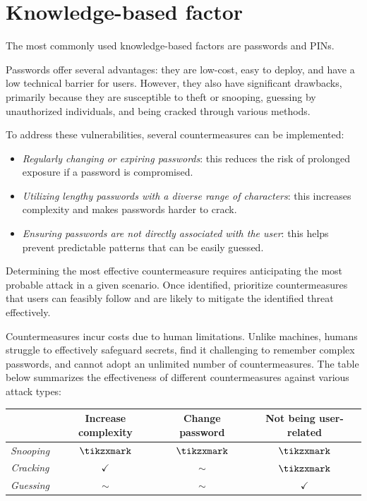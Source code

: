\section{Knowledge-based factor}

The most commonly used knowledge-based factors are passwords and PINs.

Passwords offer several advantages: they are low-cost, easy to deploy, and have a low technical barrier for users. 
However, they also have significant drawbacks, primarily because they are susceptible to theft or snooping, guessing by unauthorized individuals, and being cracked through various methods.

To address these vulnerabilities, several countermeasures can be implemented:
\begin{itemize}
    \item \textit{Regularly changing or expiring passwords}: this reduces the risk of prolonged exposure if a password is compromised.
    \item \textit{Utilizing lengthy passwords with a diverse range of characters}: this increases complexity and makes passwords harder to crack.
    \item \textit{Ensuring passwords are not directly associated with the user}: this helps prevent predictable patterns that can be easily guessed.
\end{itemize}
Determining the most effective countermeasure requires anticipating the most probable attack in a given scenario. 
Once identified, prioritize countermeasures that users can feasibly follow and are likely to mitigate the identified threat effectively.

Countermeasures incur costs due to human limitations. 
Unlike machines, humans struggle to effectively safeguard secrets, find it challenging to remember complex passwords, and cannot adopt an unlimited number of countermeasures.
The table below summarizes the effectiveness of different countermeasures against various attack types:
\begin{table}[H]
    \centering
    \begin{tabular}{c|ccc}
                      & \textbf{Increase complexity} & \textbf{Change password} & \textbf{Not being user-related} \\ \hline
    \textit{Snooping} & $\tikzxmark$                 & $\tikzxmark$             & $\tikzxmark$          \\
    \textit{Cracking} & $\checkmark$                 & $\sim$                   & $\tikzxmark$          \\
    \textit{Guessing} & $\sim$                       & $\sim$                   & $\checkmark$    
    \end{tabular}
\end{table}

